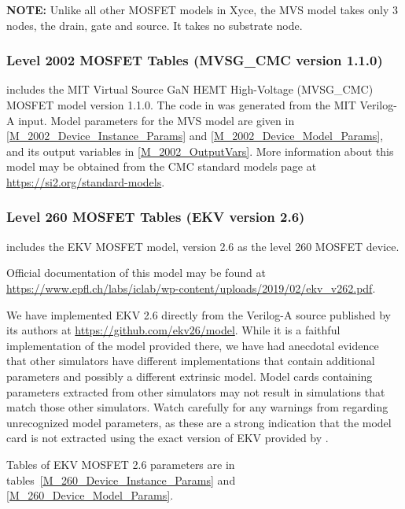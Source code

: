 {\bf NOTE: } Unlike all other MOSFET models in Xyce, the MVS model
takes only 3 nodes, the drain, gate and source.  It takes no substrate
node.




\clearpage

\subsubsection{Level 2002 MOSFET Tables (MVSG\_CMC version 1.1.0)}
\Xyce{} includes the MIT Virtual Source GaN HEMT High-Voltage
(MVSG\_CMC) MOSFET model version 1.1.0.  The code in \Xyce{} was
generated from the MIT Verilog-A input.  Model parameters for the MVS
model are given in \ref{M_2002_Device_Instance_Params} and
\ref{M_2002_Device_Model_Params}, and its output variables in
\ref{M_2002_OutputVars}.  More information about this model may be
obtained from the CMC standard models page at
\url{https://si2.org/standard-models}.






\clearpage
\subsubsection{Level 260 MOSFET Tables (EKV version 2.6)}

\Xyce{} includes the EKV MOSFET model, version 2.6 as the level 260
MOSFET device.

Official documentation of this model may be found at \url{https://www.epfl.ch/labs/iclab/wp-content/uploads/2019/02/ekv_v262.pdf}.

We have implemented EKV 2.6 directly from the Verilog-A source
published by its authors at \url{https://github.com/ekv26/model}.
While it is a faithful implementation of the model provided there, we
have had anecdotal evidence that other simulators have different
implementations that contain additional parameters and possibly a
different extrinsic model.  Model cards containing parameters
extracted from other simulators may not result in \Xyce{} simulations
that match those other simulators.  Watch carefully for any warnings
from \Xyce{} regarding unrecognized model parameters, as these are a
strong indication that the model card is not extracted using the exact
version of EKV provided by \Xyce{}.

Tables of EKV MOSFET 2.6 parameters are in
tables~\ref{M_260_Device_Instance_Params} and
\ref{M_260_Device_Model_Params}.

